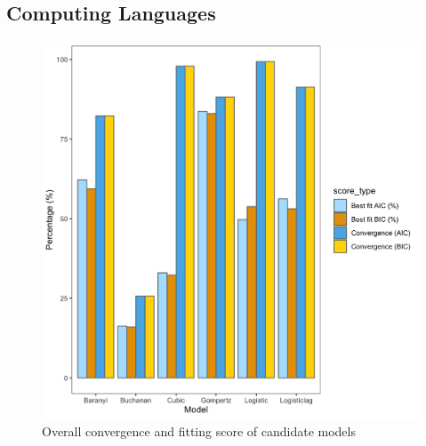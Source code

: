 \documentclass[a4paper,11pt]{article}
\theoremstyle{definition}
\begin{document}
\subsection{Computing Languages}
\begin{figure}[!ht]
            \centering
                \begin{center}
                     \includegraphics[width=\linewidth]{../results/stats.png}
                     \caption{Overall convergence and fitting score of candidate models}
                \end{center}
        \end{figure}
\end{document}
